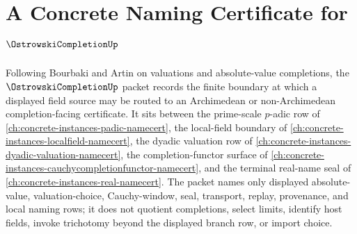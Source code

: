 \chapter{A Concrete Naming Certificate for $\OstrowskiCompletionUp$}
\label{ch:concrete-instances-ostrowski-completion-namecert}

Following Bourbaki and Artin on valuations and absolute-value completions, the $\OstrowskiCompletionUp$ packet records the finite boundary at which a displayed field source may be routed to an Archimedean or non-Archimedean completion-facing certificate. It sits between the prime-scale $p$-adic row of \autoref{ch:concrete-instances-padic-namecert}, the local-field boundary of \autoref{ch:concrete-instances-localfield-namecert}, the dyadic valuation row of \autoref{ch:concrete-instances-dyadic-valuation-namecert}, the completion-functor surface of \autoref{ch:concrete-instances-cauchycompletionfunctor-namecert}, and the terminal real-name seal of \autoref{ch:concrete-instances-real-namecert}. The packet names only displayed absolute-value, valuation-choice, Cauchy-window, seal, transport, replay, provenance, and local naming rows; it does not quotient completions, select limits, identify host fields, invoke trichotomy beyond the displayed branch row, or import choice.

